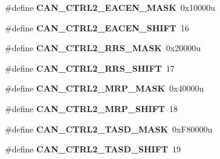 \begin{DoxyCompactItemize}
\item 
\hypertarget{group___c_a_n___register___masks_gacf49e8d44f1f8993cda6e29a36c7a90f}{}\#define {\bfseries C\+A\+N\+\_\+\+C\+T\+R\+L2\+\_\+\+E\+A\+C\+E\+N\+\_\+\+M\+A\+S\+K}~0x10000u\label{group___c_a_n___register___masks_gacf49e8d44f1f8993cda6e29a36c7a90f}

\item 
\hypertarget{group___c_a_n___register___masks_gae0e425b33b8b975d6a33b8e090e040e8}{}\#define {\bfseries C\+A\+N\+\_\+\+C\+T\+R\+L2\+\_\+\+E\+A\+C\+E\+N\+\_\+\+S\+H\+I\+F\+T}~16\label{group___c_a_n___register___masks_gae0e425b33b8b975d6a33b8e090e040e8}

\item 
\hypertarget{group___c_a_n___register___masks_ga5776a65b75ea42afc810081a66d4e1b4}{}\#define {\bfseries C\+A\+N\+\_\+\+C\+T\+R\+L2\+\_\+\+R\+R\+S\+\_\+\+M\+A\+S\+K}~0x20000u\label{group___c_a_n___register___masks_ga5776a65b75ea42afc810081a66d4e1b4}

\item 
\hypertarget{group___c_a_n___register___masks_ga143cc0bdd4c88978ccbe42849d3fc038}{}\#define {\bfseries C\+A\+N\+\_\+\+C\+T\+R\+L2\+\_\+\+R\+R\+S\+\_\+\+S\+H\+I\+F\+T}~17\label{group___c_a_n___register___masks_ga143cc0bdd4c88978ccbe42849d3fc038}

\item 
\hypertarget{group___c_a_n___register___masks_ga7f07676c379363d679cfcb6c362e1cc6}{}\#define {\bfseries C\+A\+N\+\_\+\+C\+T\+R\+L2\+\_\+\+M\+R\+P\+\_\+\+M\+A\+S\+K}~0x40000u\label{group___c_a_n___register___masks_ga7f07676c379363d679cfcb6c362e1cc6}

\item 
\hypertarget{group___c_a_n___register___masks_ga868c342244c921f9824c4d0c172f4081}{}\#define {\bfseries C\+A\+N\+\_\+\+C\+T\+R\+L2\+\_\+\+M\+R\+P\+\_\+\+S\+H\+I\+F\+T}~18\label{group___c_a_n___register___masks_ga868c342244c921f9824c4d0c172f4081}

\item 
\hypertarget{group___c_a_n___register___masks_ga50bd2b3ca86be2357515614d717e8167}{}\#define {\bfseries C\+A\+N\+\_\+\+C\+T\+R\+L2\+\_\+\+T\+A\+S\+D\+\_\+\+M\+A\+S\+K}~0x\+F80000u\label{group___c_a_n___register___masks_ga50bd2b3ca86be2357515614d717e8167}

\item 
\hypertarget{group___c_a_n___register___masks_gac9265ea7ee9b07803fdb62c92aa85ea0}{}\#define {\bfseries C\+A\+N\+\_\+\+C\+T\+R\+L2\+\_\+\+T\+A\+S\+D\+\_\+\+S\+H\+I\+F\+T}~19\label{group___c_a_n___register___masks_gac9265ea7ee9b07803fdb62c92aa85ea0}


\end{DoxyCompactItemize}
